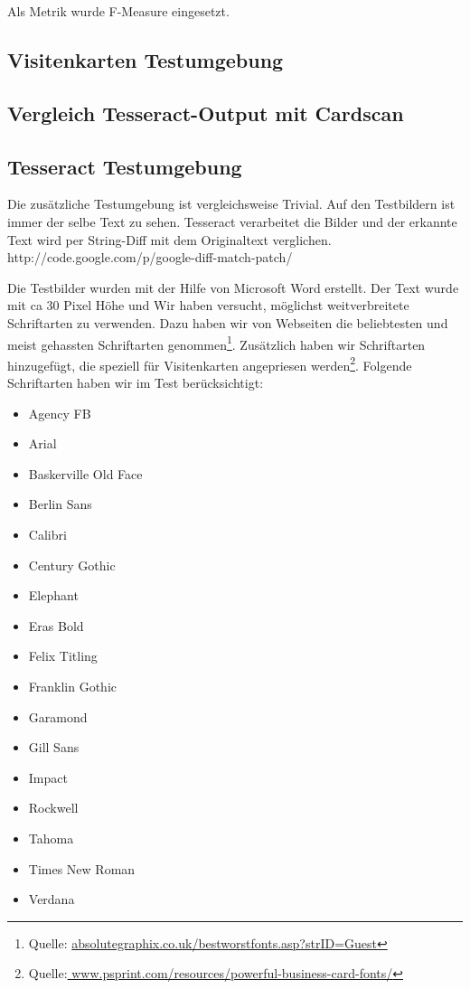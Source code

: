 \documentclass[10pt]{article}
\begin{document}
Als Metrik wurde F-Measure eingesetzt. 

\subsection{Visitenkarten Testumgebung}
\subsection{Vergleich Tesseract-Output mit Cardscan}

\subsection{Tesseract Testumgebung}
Die zusätzliche Testumgebung ist vergleichsweise Trivial. Auf den Testbildern ist immer der selbe Text zu sehen. Tesseract verarbeitet die Bilder und der erkannte Text wird per String-Diff mit dem Originaltext verglichen.
http://code.google.com/p/google-diff-match-patch/

Die Testbilder wurden mit der Hilfe von Microsoft Word erstellt. Der Text wurde mit ca 30 Pixel Höhe und 
Wir haben versucht, möglichst weitverbreitete Schriftarten zu verwenden. Dazu haben wir von Webseiten die beliebtesten und meist gehassten Schriftarten genommen\footnote{Quelle: \url{absolutegraphix.co.uk/bestworstfonts.asp?strID=Guest}}.  
Zusätzlich haben wir Schriftarten hinzugefügt, die speziell für Visitenkarten angepriesen werden\footnote{Quelle:\url{ www.psprint.com/resources/powerful-business-card-fonts/}}. Folgende Schriftarten haben wir im Test berücksichtigt:
\begin{itemize}
\item Agency FB
\item Arial
\item Baskerville Old Face
\item Berlin Sans
\item Calibri
\item Century Gothic
\item Elephant
\item Eras Bold
\item Felix Titling
\item Franklin Gothic
\item Garamond
\item Gill Sans
\item Impact
\item Rockwell
\item Tahoma
\item Times New Roman
\item Verdana
\end{itemize}
\end{document}
